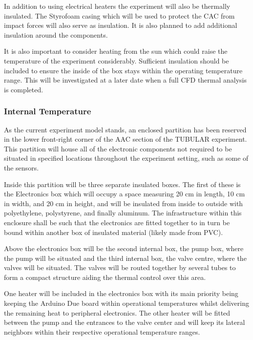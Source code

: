 \begin{centering}
In addition to using electrical heaters the experiment will also be thermally insulated. The Styrofoam casing which will be used to protect the CAC from impact forces will also serve as insulation. It is also planned to add additional insulation around the components.  
\end{centering}

\begin{centering}
It is also important to consider heating from the sun which could raise the temperature of the experiment considerably. Sufficient insulation should be included to ensure the inside of the box stays within the operating temperature range. This will be investigated at a later date when a full CFD thermal analysis is completed.
\end{centering}
\bigskip

\pagebreak


\raggedbottom

\subsubsection{Internal Temperature}

As the current experiment model stands, an enclosed partition has been reserved in the lower front-right corner of the AAC section of the TUBULAR experiment. This partition will house all of the electronic components not required to be situated in specified locations throughout the experiment setting, such as some of the sensors. 

Inside this partition will be three separate insulated boxes. The first of these is the Electronics box which will occupy a space measuring 20 cm in length, 10 cm in width, and 20 cm in height, and will be insulated from inside to outside with polyethylene, polystyrene, and finally aluminum. The infrastructure within this enclosure shall be such that the electronics are fitted together to in turn be bound within another box of insulated material (likely made from PVC). 

Above the electronics box will be the second internal box, the pump box, where the pump will be situated and the third internal box, the valve centre, where the valves will be situated. The valves will be routed together by several tubes to form a compact structure aiding the thermal control over this area. 

One heater will be included in the electronics box with its main priority being keeping the Arduino Due board within operational temperatures whilst delivering the remaining heat to peripheral electronics. The other heater will be fitted between the pump and the entrances to the valve center and will keep its lateral neighbors within their respective operational temperature ranges.

